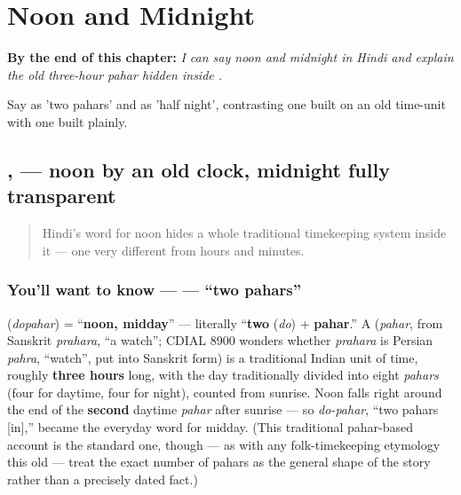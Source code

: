 
\chapter{Noon and Midnight}
\label{ch:hi-noon-and-midnight}

\begin{chapteropening}
\textbf{By the end of this chapter:} \emph{I can say noon and midnight in Hindi and explain the old three-hour pahar hidden inside .}

Say  as 'two pahars' and   as 'half night', contrasting one built on an old time-unit with one built plainly.
\end{chapteropening}

\section[\texorpdfstring{\hi{दोपहर} \hi{आधी} \hi{रात} (dopahar ādhī rāt)}{दोपहर आधी रात (dopahar ādhī rāt)}]{,   — noon by an old clock, midnight fully transparent}

\label{lesson:HI-C17-dopahar-aadhi-raat}



\begin{quote}
Hindi's word for noon hides a whole traditional timekeeping system inside it — one very different from hours and minutes.
\end{quote}

\subsection*{You'll want to know —  — \textquotedblleft{}two pahars\textquotedblright{}}
\textbf{} (\emph{dopahar}) = \textquotedblleft{}\textbf{noon, midday}\textquotedblright{} — literally \textquotedblleft{}\textbf{two} (\emph{do}) + \textbf{pahar}.\textquotedblright{} A \textbf{} (\emph{pahar}, from Sanskrit \emph{prahara}, \textquotedblleft{}a watch\textquotedblright{}; CDIAL 8900 wonders whether \emph{prahara} is Persian \emph{pahra}, \textquotedblleft{}watch\textquotedblright{}, put into Sanskrit form) is a traditional Indian unit of time, roughly \textbf{three hours} long, with the day traditionally divided into eight \emph{pahars} (four for daytime, four for night), counted from sunrise. Noon falls right around the end of the \textbf{second} daytime \emph{pahar} after sunrise — so \emph{do-pahar}, \textquotedblleft{}two pahars {[}in{]},\textquotedblright{} became the everyday word for midday. (This traditional pahar-based account is the standard one, though — as with any folk-timekeeping etymology this old — treat the exact number of pahars as the general shape of the story rather than a precisely dated fact.)

